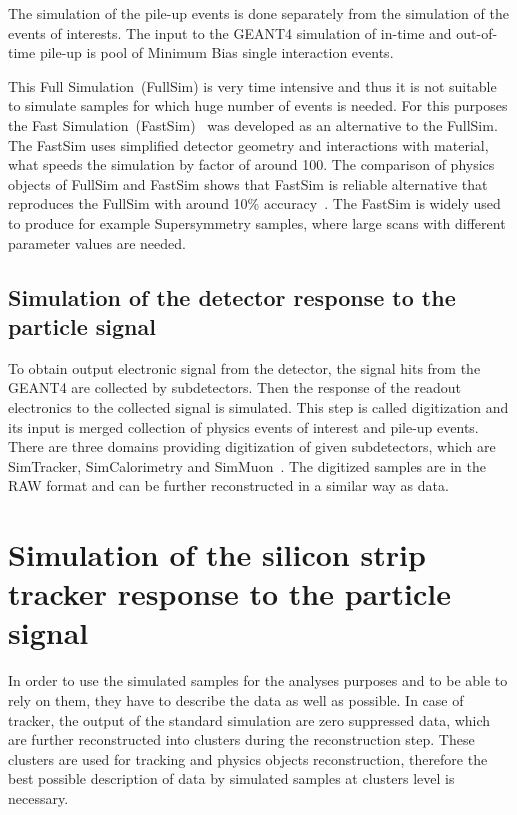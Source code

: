 The simulation of the pile-up events is done separately from the simulation of the events of interests. The input to the GEANT4 simulation of in-time and out-of-time pile-up is pool of Minimum Bias single interaction events.


This Full Simulation~(FullSim) is very time intensive and thus it is not suitable to simulate samples for which huge number of events is needed. For this purposes the Fast Simulation~(FastSim)~\cite{Sekmen:2017hzs, CMS:2010spa, Giammanco:2014bza} was developed as an alternative to the FullSim. The FastSim uses simplified detector geometry and interactions with material, what speeds the simulation by factor of around 100. The comparison of physics objects of FullSim and FastSim shows that FastSim is reliable alternative that reproduces the FullSim with around 10\% accuracy~\cite{Abdullin:2011zz, Sekmen:2017hzs}. The FastSim is widely used to produce for example Supersymmetry samples, where large scans with different parameter values are needed.

\subsection{Simulation of the detector response to the particle signal}

To obtain output electronic signal from the detector, the signal hits from the GEANT4 are collected by subdetectors. Then the response of the readout electronics to the collected signal is simulated. This step is called digitization and its input is merged collection of physics events of interest and pile-up events. There are three domains providing digitization of given subdetectors, which are SimTracker, SimCalorimetry and SimMuon~\cite{website:simdigi}. The digitized samples are in the RAW format and can be further reconstructed in a similar way as data.

\newpage

\section{Simulation of the silicon strip tracker response to the particle signal}

In order to use the simulated samples for the analyses purposes and to be able to rely on them, they have to describe the data as well as possible. In case of tracker, the output of the standard simulation are zero suppressed data, which are further reconstructed into clusters during the reconstruction step. These clusters are used for tracking and physics objects reconstruction, therefore the best possible description of data by simulated samples at clusters level is necessary.

